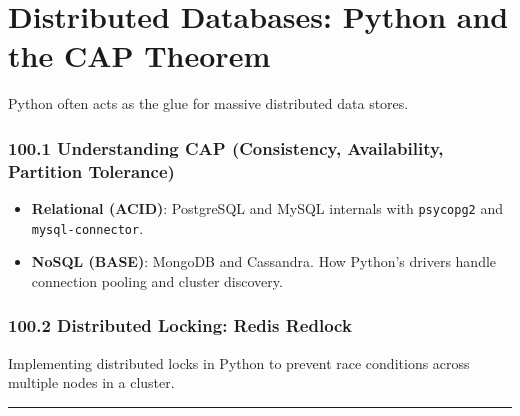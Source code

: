 \hypertarget{distributed-databases-python-and-the-cap-theorem}{%
\chapter{Distributed Databases: Python and the CAP
Theorem}\label{distributed-databases-python-and-the-cap-theorem}}

Python often acts as the glue for massive distributed data stores.

\hypertarget{understanding-cap-consistency-availability-partition-tolerance}{%
\subsection{100.1 Understanding CAP (Consistency, Availability,
Partition
Tolerance)}\label{understanding-cap-consistency-availability-partition-tolerance}}

\begin{itemize}
\tightlist
\item
  \textbf{Relational (ACID)}: PostgreSQL and MySQL internals with
  \passthrough{\lstinline!psycopg2!} and
  \passthrough{\lstinline!mysql-connector!}.
\item
  \textbf{NoSQL (BASE)}: MongoDB and Cassandra. How Python's drivers
  handle connection pooling and cluster discovery.
\end{itemize}

\hypertarget{distributed-locking-redis-redlock}{%
\subsection{100.2 Distributed Locking: Redis
Redlock}\label{distributed-locking-redis-redlock}}

Implementing distributed locks in Python to prevent race conditions
across multiple nodes in a cluster.

\begin{center}\rule{0.5\linewidth}{0.5pt}\end{center}
